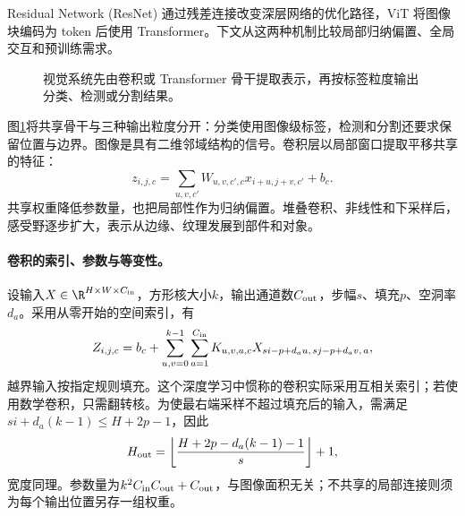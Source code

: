 Residual Network (ResNet) 通过残差连接改变深层网络的优化路径，ViT 将图像块编码为 token 后使用 Transformer\cite{he2016resnet,dosovitskiy2021vit}。下文从这两种机制比较局部归纳偏置、全局交互和预训练需求。
\begin{figure}[htbp]
\centering
{}
\caption{视觉系统先由卷积或 Transformer 骨干提取表示，再按标签粒度输出分类、检测或分割结果。}
\label{fig:vision-output-granularity}
\end{figure}
图\ref{fig:vision-output-granularity}将共享骨干与三种输出粒度分开：分类使用图像级标签，检测和分割还要求保留位置与边界。图像是具有二维邻域结构的信号。卷积层以局部窗口提取平移共享的特征：
\begin{equation}
 z_{i,j,c}=\sum_{u,v,c'}W_{u,v,c',c}x_{i+u,j+v,c'}+b_c.
\end{equation}
共享权重降低参数量，也把局部性作为归纳偏置。堆叠卷积、非线性和下采样后，感受野逐步扩大，表示从边缘、纹理发展到部件和对象。

\paragraph{卷积的索引、参数与等变性。}
设输入$X\in\R^{H\times W\times C_{\rm in}}$，方形核大小$k$，输出通道数$C_{\rm out}$，步幅$s$、填充$p$、空洞率$d_a$。采用从零开始的空间索引，有
\begin{equation}
 Z_{i,j,c}=b_c+\sum_{u,v=0}^{k-1}\sum_{a=1}^{C_{\rm in}}
 K_{u,v,a,c}X_{si-p+d_au,\,sj-p+d_av,\,a},
\end{equation}
越界输入按指定规则填充。这个深度学习中惯称的卷积实际采用互相关索引；若使用数学卷积，只需翻转核。为使最右端采样不超过填充后的输入，需满足$s i+d_a(k-1)\leq H+2p-1$，因此
\begin{equation}
 H_{\rm out}=\left\lfloor\frac{H+2p-d_a(k-1)-1}{s}\right\rfloor+1,
\end{equation}
宽度同理。参数量为$k^2C_{\rm in}C_{\rm out}+C_{\rm out}$，与图像面积无关；不共享的局部连接则须为每个输出位置另存一组权重。

